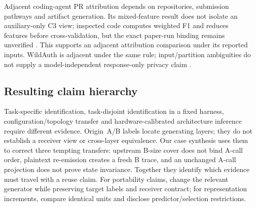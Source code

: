 Adjacent coding-agent PR attribution depends on repositories, submission pathways and artifact generation. Its mixed-feature result does not isolate an auxiliary-only C3 view; inspected code computes weighted F1 and reduces features before cross-validation, but the exact paper-run binding remains unverified \cite{ghaleb2026codingfingerprint}. This supports an adjacent attribution comparison under its reported inputs. WildAuth is adjacent under the same rule; input/partition ambiguities do not supply a model-independent response-only privacy claim \cite{wang2026dialogue}.

\subsection{Resulting claim hierarchy}
Task-specific identification, task-disjoint identification in a fixed harness, configuration/topology transfer and hardware-calibrated architecture inference require different evidence. Origin~A/B labels locate generating layers; they do not establish a receiver view or cross-layer equivalence. Our case synthesis uses them to correct three tempting transfers: upstream B-size cover does not bind A-call order, plaintext re-emission creates a fresh B trace, and an unchanged A-call projection does not prove state invariance. Together they identify which evidence must travel with a reuse claim. For portability claims, change the relevant generator while preserving target labels and receiver contract; for representation increments, compare identical units and disclose predictor/selection restrictions.
